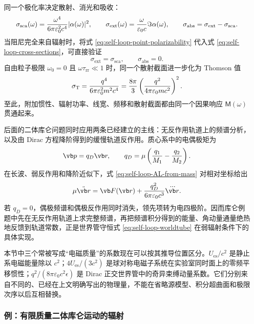 同一个极化率决定散射、消光和吸收：
\begin{equation}
 \sigma_{\mathrm{sca}}(\omega)
 ={\omega^4\over6\pi\varepsilon_0^2c^4}|\alpha(\omega)|^2,
 \qquad
 \sigma_{\mathrm{ext}}(\omega)
 ={\omega\over\varepsilon_0c}\Im\alpha(\omega),
 \qquad
 \sigma_{\mathrm{abs}}=\sigma_{\mathrm{ext}}-\sigma_{\mathrm{sca}}.
 \label{eq:self-loop-cross-sections}
\end{equation}
当阻尼完全来自辐射时，将式 \eqref{eq:self-loop-point-polarizability} 代入式 \eqref{eq:self-loop-cross-sections}，可直接验证
\begin{equation*}
 \sigma_{\mathrm{ext}}=\sigma_{\mathrm{sca}},
 \qquad
 \sigma_{\mathrm{abs}}=0.
\end{equation*}
自由粒子极限 $\omega_0=0$ 且 $\omega\tau_{\mathrm{rr}}\ll1$ 时，同一个散射截面进一步化为 Thomson 值
\begin{equation}
 \sigma_{\mathrm T}
 ={q^4\over6\pi\varepsilon_0^2m^2c^4}
 ={8\pi\over3}
 \left({q^2\over4\pi\varepsilon_0mc^2}\right)^2.
 \label{eq:self-loop-Thomson}
\end{equation}
至此，附加惯性、辐射功率、线宽、频移和散射截面都由同一个因果响应 $\mathsf M(\omega)$ 贯通起来。

后面的二体库仑问题同时应用两条已经建立的主线：无反作用轨道上的频谱分析，以及由 Dirac 方程降阶得到的缓慢轨道反作用。质心系中的电偶极矩为
\begin{equation*}
 \vb p=q_D\vb r,
 \qquad
 q_D=\mu\left({q_1\over M_1}-{q_2\over M_2}\right).
\end{equation*}
在长波、弱反作用和降阶近似下，式 \eqref{eq:self-loop-AL-from-mass} 对相对坐标给出
\begin{equation}
 \mu\ddot{\vb r}
 =\vb F(\vb r)
 +{q_D^2\over6\pi\varepsilon_0c^3}\dddot{\vb r}.
 \label{eq:self-loop-two-body}
\end{equation}
若 $q_D=0$，偶极频谱和偶极反作用同时消失，领先项转为电四极阶。因而库仑例题中先在无反作用轨道上求完整频谱，再把频谱积分得到的能量、角动量通量绝热地反馈到轨道常数，正是世界管守恒式 \eqref{eq:self-loop-worldtube} 在弱辐射条件下的具体实现。

本节中三个常被写成“电磁质量”的系数现在可以按其推导位置区分。$U_{\mathrm{es}}/c^2$ 是静止系电磁能量除以 $c^2$；$4U_{\mathrm{es}}/(3c^2)$ 是球对称电磁子系统在实验室同时面上的零频平移惯性；$q^2/(8\pi\varepsilon_0c^2\epsilon)$ 是 Dirac 正交世界管中的奇异束缚动量系数。它们分别来自不同的、已经在上文明确写出的物理量，不能在省略源模型、积分超曲面和极限次序以后互相替换。


\subsubsection{例：有限质量二体库仑运动的辐射}


